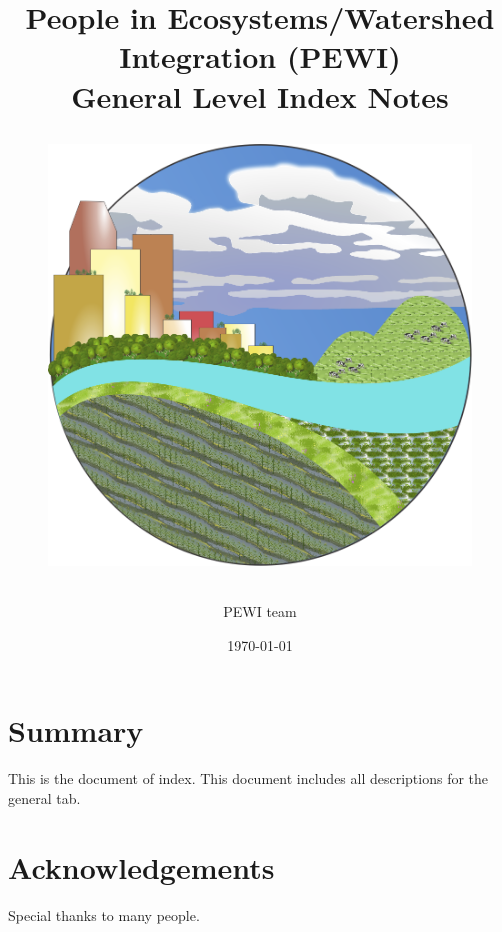 \documentclass[11pt]{article}
\begin{document}
\begin{titlepage}
\title{
	{\large People in Ecosystems/Watershed Integration (PEWI)}\\
	{\huge {General Level Index Notes\\}}
	\begin{figure}[H]
	\centering
	\includegraphics[height=3 in]{../imgs/updatedPewiLogo.png}
	\end{figure}
}
\author{PEWI team}
\date {\today} %
\maketitle
\thispagestyle{empty} %
\end{titlepage}

\section*{Summary}
This is the document of index. This document includes all descriptions for the general tab.
\cleardoublepage

\section*{Acknowledgements}
Special thanks to many people.
\cleardoublepage


\tableofcontents
\thispagestyle{empty} %
\cleardoublepage %

\setcounter{page}{1}
\end{document}
